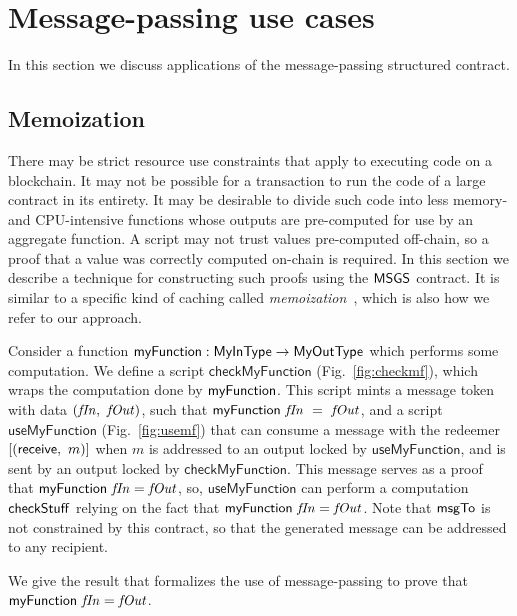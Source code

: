 
\section{Message-passing use cases}
\label{sec:usecases}

In this section we discuss applications of the message-passing structured contract.

\subsection{Memoization}
\label{sec:memo}

There may be strict resource use constraints that apply to executing code on a
blockchain. It may not be possible for a transaction to run the code of a large contract in its
entirety. It may be desirable to divide such code into less memory- and CPU-intensive
functions whose outputs are pre-computed for use by an aggregate function.
A script may not trust values pre-computed off-chain,
so a proof that a value was correctly computed on-chain is required.
In this section we describe a technique for constructing such proofs using
the $\mathsf{MSGS}$ contract. It is
similar to a specific kind of caching called \emph{memoization}~\cite{memoization},
which is also how we refer to our approach.

Consider a function $\mathsf{myFunction} : \mathsf{MyInType} \to \mathsf{MyOutType}$
which performs some computation. We define a script $\mathsf{checkMyFunction}$
(Fig.~\ref{fig:checkmf}), which wraps the computation
done by $\mathsf{myFunction}$. This script mints a message token with
data $(\mathit{fIn},~\mathit{fOut})$, such that $\mathsf{myFunction}~\mathit{fIn}~=~\mathit{fOut}$,
and a script $\mathsf{useMyFunction}$ (Fig.~\ref{fig:usemf}) that can
consume a message with the redeemer $[(\mathsf{receive},~m)]$
when $m$ is addressed to an output locked by $\mathsf{useMyFunction}$, and is
sent by an output locked by $\mathsf{checkMyFunction}$.
This message serves as a proof that $\mathsf{myFunction}~\mathit{fIn} = \mathit{fOut}$,
so, $\mathsf{useMyFunction}$ can perform a
computation $\mathsf{checkStuff}$ relying on the fact that $\mathsf{myFunction}~\mathit{fIn} = \mathit{fOut}$.
Note that $\mathsf{msgTo}$ is not constrained by this contract, so that the generated
message can be addressed to any recipient.

We give the result that formalizes the use of message-passing
to prove that $\mathsf{myFunction}~\mathit{fIn} = \mathit{fOut}$.

